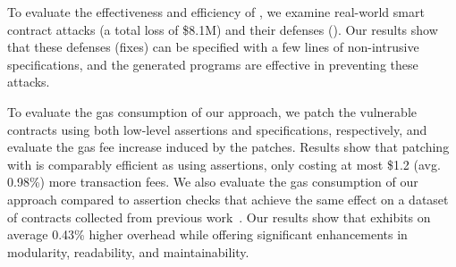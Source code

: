 


To evaluate the effectiveness and efficiency of \lang, we
examine \numCaseStudied real-world smart contract attacks (a total loss of \$8.1M) and their defenses ().
Our results show that these defenses (fixes) can be specified with a few 
lines of non-intrusive \lang specifications, and the generated programs are effective in preventing these attacks.

To evaluate the gas consumption of our approach,
we patch the vulnerable contracts using 
both low-level assertions and \lang specifications, respectively, 
and evaluate the gas fee increase induced by the patches.
Results show that patching with \lang is comparably efficient as using assertions, only costing at most \$1.2 (avg. 0.98\%) more transaction fees.
We also evaluate the gas consumption of our approach 
compared to assertion checks that achieve the same effect on 
a dataset of contracts collected from previous work~\cite{DBLP:conf/pldi/LiCL20}.
Our results show that \lang exhibits on average 0.43\% higher overhead while offering 
significant enhancements in modularity, readability, and maintainability.



